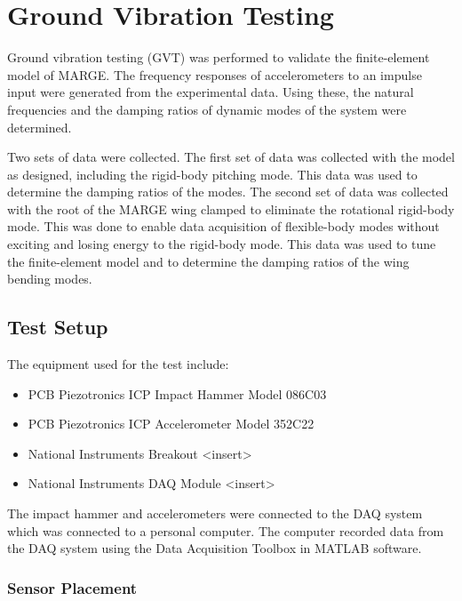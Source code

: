 \chapter{Ground Vibration Testing}
\label{ch:gvt}

Ground vibration testing (GVT) was performed to validate the finite-element model of MARGE. The frequency responses of accelerometers to an impulse input were generated from the experimental data. Using these, the natural frequencies and the damping ratios of dynamic modes of the system were determined.

Two sets of data were collected. The first set of data was collected with the model as designed, including the rigid-body pitching mode. This data was used to determine the damping ratios of the modes. The second set of data was collected with the root of the MARGE wing clamped to eliminate the rotational rigid-body mode. This was done to enable data acquisition of flexible-body modes without exciting and losing energy to the rigid-body mode. This data was used to tune the finite-element model and to determine the damping ratios of the wing bending modes.

\section{Test Setup} %

The equipment used for the test include:
\begin{itemize}
    \item PCB Piezotronics ICP Impact Hammer Model 086C03
    \item PCB Piezotronics ICP Accelerometer Model 352C22
    \item National Instruments Breakout <insert>
    \item National Instruments DAQ Module <insert>
\end{itemize}

The impact hammer and accelerometers were connected to the DAQ system which was connected to a personal computer. The computer recorded data from the DAQ system using the Data Acquisition Toolbox in MATLAB software.

\subsection{Sensor Placement}

